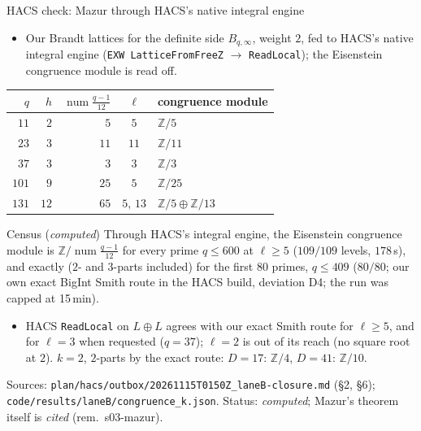 \begin{frame}[shrink=3]{HACS check: Mazur through HACS's native integral engine}
  \footnotesize
  \begin{itemize}
    \item Our Brandt lattices for the definite side $B_{q,\infty}$, weight $2$, fed to HACS's native integral engine
      (\texttt{EXW LatticeFromFreeZ} $\to$ \texttt{ReadLocal}); the Eisenstein congruence module is read off.
  \end{itemize}
  \begin{center}\scriptsize
  \begin{tabular}{rrrcl}\toprule
    $q$ & $h$ & $\operatorname{num}\frac{q-1}{12}$ & $\ell$ & congruence module\\\midrule
    $11$  & $2$  & $5$  & $5$      & $\mathbb Z/5$\\
    $23$  & $3$  & $11$ & $11$     & $\mathbb Z/11$\\
    $37$  & $3$  & $3$  & $3$      & $\mathbb Z/3$\\
    $101$ & $9$  & $25$ & $5$      & $\mathbb Z/25$\\
    $131$ & $12$ & $65$ & $5,\,13$ & $\mathbb Z/5\oplus\mathbb Z/13$\\\bottomrule
  \end{tabular}
  \end{center}
  \begin{block}{Census (\emph{computed})}
    Through HACS's integral engine, the Eisenstein congruence module is $\mathbb Z/\operatorname{num}\frac{q-1}{12}$ for every prime
    $q\le 600$ at $\ell\ge5$ ($109/109$ levels, $178$\,s), and exactly ($2$- and $3$-parts included) for the first $80$ primes, $q\le 409$
    ($80/80$; our own exact BigInt Smith route in the HACS build, deviation D4; the run was capped at 15\,min).
  \end{block}
  \begin{itemize}
    \item HACS \texttt{ReadLocal} on $L\oplus L$ agrees with our exact Smith route for $\ell\ge 5$, and for $\ell=3$ when requested ($q=37$);
      $\ell=2$ is out of its reach (no square root at $2$). $k=2$, $2$-parts by the exact route: $D=17$: $\mathbb Z/4$, $D=41$: $\mathbb Z/10$.
  \end{itemize}
  \vfill
  {\tiny Sources: \texttt{plan/hacs/outbox/20261115T0150Z\_laneB-closure.md} (\S2, \S6); \texttt{code/results/laneB/congruence\_k.json}.
  Status: \emph{computed}; Mazur's theorem itself is \emph{cited} (rem.\ s03-mazur).}
\end{frame}

